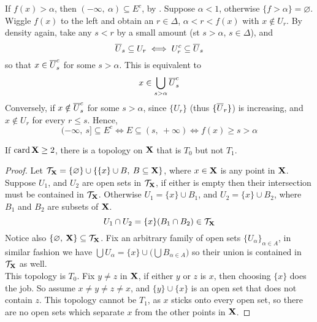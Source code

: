 \documentclass[../../main.tex]{subfiles}
\begin{document}
If $f(x) > \alpha$, then $(-\infty,\: \alpha)\subseteq E^c$, by  . Suppose $\alpha<1$, otherwise $\{f>\alpha\}=\varnothing$. Wiggle $f(x)$ to the left and obtain an $r\in\Delta$, $\alpha<r<f(x)$ with $x\notin U_r$. By density again, take any $s<r$ by a small amount (st $s>\alpha$, $s\in \Delta$), and
\[
    \overline{U}_s\subseteq U_r\iff U_r^c\subseteq\overline{U}_s
\]
so that $x\in \overline{U}_s^c$ for some $s>\alpha$. This is equivalent to 
\[
    x\in\bigcup_{s>\alpha}\overline{U}_s^c
\]
Conversely, if $x\notin \overline{U}_s^c$ for some $s>\alpha$,  since $\{U_r\}$ (thus $\{\overline{U}_r\}$) is increasing, and $x\notin U_r$ for every $r\leq s$. Hence,
\[
    (-\infty,\: s]\subseteq E^c\iff E\subseteq (s,\: +\infty)\iff f(x)\geq s>\alpha
\]
\newpage

\fexercisesHeader

\begin{wts}
    If $\operatorname{card}{{\mathbf{X}}}\geq 2$, there is a topology on ${\mathbf{X}}$ that is $T_0$ but not $T_1$.
\end{wts}
\begin{proof}
    Let $\mathcal{T}_{\mathbf{X}} = \{\varnothing\}\cup\{\{x\}\cup B,\: B\subseteq {\mathbf{X}}\}$, where $x\in{\mathbf{X}}$ is any point in ${\mathbf{X}}$. Suppose $U_1$, and $U_2$ are open sets in $\mathcal{T}_{\mathbf{X}}$, if either is empty then their intersection must be contained in $\mathcal{T}_{\mathbf{X}}$. Otherwise $U_1 = \{x\}\cup B_1$, and $U_2 = \{x\}\cup B_2$, where $B_1$ and $B_2$ are subsets of ${\mathbf{X}}$.
    \[
        U_1\cap U_2 = \{x\}(B_1\cap B_2)\in \mathcal{T}_{\mathbf{X}}
    \]
    Notice also $\{\varnothing,\: {\mathbf{X}}\}\subseteq\mathcal{T}_{\mathbf{X}}$. Fix an arbitrary family of open sets $\{U_\alpha\}_{\alpha\in A}$, in similar fashion we have $\bigcup U_\alpha = \{x\}\cup\biggl( \bigcup B_{\alpha\in A} \biggr)$ so their union is contained in $\mathcal{T}_{\mathbf{X}}$ as well.\\

    This topology is $T_0$. Fix $y\neq z$ in ${\mathbf{X}}$, if either $y$ or $z$ is $x$, then choosing $\{x\}$ does the job. So assume $x\neq y\neq z\neq x$, and $\{y\}\cup \{x\}$ is an open set that does not contain $z$. This topology cannot be $T_1$, as $x$ sticks onto every open set, so there are no open sets which separate $x$ from the other points in ${\mathbf{X}}$.
\end{proof}
\newpage
\end{document}
